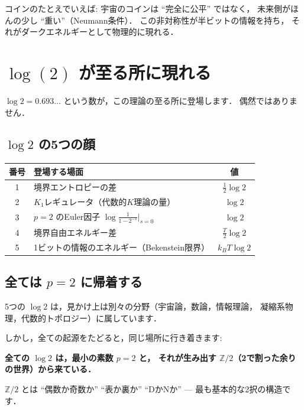 \documentclass[11pt,a4paper]{article}
\begin{document}
コインのたとえでいえば: 宇宙のコインは ``完全に公平'' ではなく，
未来側がほんの少し ``重い''（Neumann条件）．
この非対称性が半ビットの情報を持ち，
それがダークエネルギーとして物理的に現れる．

\section{$\log(2)$ が至る所に現れる}

$\log 2 = 0.693\ldots$ という数が，この理論の至る所に登場します．
偶然ではありません．

\subsection{$\log 2$ の5つの顔}

\begin{center}
\begin{tabular}{clc}
\toprule
番号 & 登場する場面 & 値 \\
\midrule
1 & 境界エントロピーの差 & $\frac{1}{2}\log 2$ \\
2 & $K_1$レギュレータ（代数的$K$理論の量） & $\log 2$ \\
3 & $p=2$ のEuler因子 $\log\frac{1}{1-2^{-s}}\big|_{s=0}$ & $\log 2$ \\
4 & 境界自由エネルギー差 & $\frac{T}{2}\log 2$ \\
5 & 1ビットの情報のエネルギー（Bekenstein限界） & $k_BT\log 2$ \\
\bottomrule
\end{tabular}
\end{center}

\subsection{全ては $p=2$ に帰着する}

5つの $\log 2$ は，見かけ上は別々の分野（宇宙論，数論，情報理論，
凝縮系物理，代数的トポロジー）に属しています．

しかし，全ての起源をたどると，同じ場所に行き着きます:

\begin{tcolorbox}[colback=green!5,colframe=green!50!black,title=$\log 2$ の起源]
\textbf{全ての $\log 2$ は，最小の素数 $p=2$ と，
それが生み出す $\mathbb{Z}/2$（2で割った余りの世界）から来ている．}

$\mathbb{Z}/2$ とは ``偶数か奇数か'' ``表か裏か'' ``DかNか''
--- 最も基本的な2択の構造です．
\end{tcolorbox}
\end{document}
